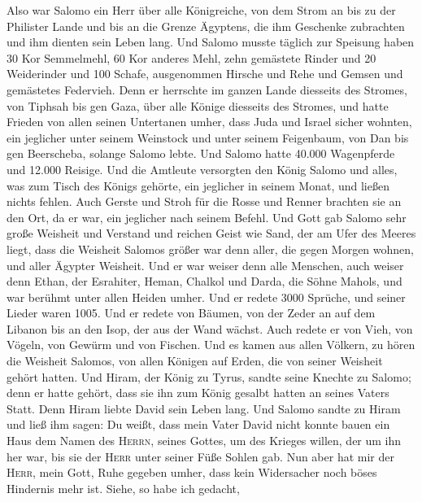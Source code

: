  Also war Salomo ein Herr über alle Königreiche, von dem
Strom an bis zu der Philister Lande und bis an die Grenze Ägyptens, die
ihm Geschenke zubrachten und ihm dienten sein Leben lang. 
Und Salomo musste täglich zur Speisung haben 30 Kor Semmelmehl, 60 Kor
anderes Mehl,  zehn gemästete Rinder und 20 Weiderinder
und 100 Schafe, ausgenommen Hirsche und Rehe und Gemsen und gemästetes
Federvieh.  Denn er herrschte im ganzen Lande diesseits
des Stromes, von Tiphsah bis gen Gaza, über alle Könige diesseits des
Stromes, und hatte Frieden von allen seinen Untertanen umher,
 dass Juda und Israel sicher wohnten, ein jeglicher unter
seinem Weinstock und unter seinem Feigenbaum, von Dan bis gen
Beerscheba, solange Salomo lebte.  Und Salomo hatte 40.000
Wagenpferde und 12.000 Reisige.  Und die Amtleute
versorgten den König Salomo und alles, was zum Tisch des Königs gehörte,
ein jeglicher in seinem Monat, und ließen nichts fehlen. 
Auch Gerste und Stroh für die Rosse und Renner brachten sie an den Ort,
da er war, ein jeglicher nach seinem Befehl.  Und Gott gab
Salomo sehr große Weisheit und Verstand und reichen Geist wie Sand, der
am Ufer des Meeres liegt,  dass die Weisheit Salomos
größer war denn aller, die gegen Morgen wohnen, und aller Ägypter
Weisheit.  Und er war weiser denn alle Menschen, auch
weiser denn Ethan, der Esrahiter, Heman, Chalkol und Darda, die Söhne
Mahols, und war berühmt unter allen Heiden umher.  Und er
redete 3000 Sprüche, und seiner Lieder waren 1005.  Und
er redete von Bäumen, von der Zeder an auf dem Libanon bis an den Isop,
der aus der Wand wächst. Auch redete er von Vieh, von Vögeln, von Gewürm
und von Fischen.  Und es kamen aus allen Völkern, zu
hören die Weisheit Salomos, von allen Königen auf Erden, die von seiner
Weisheit gehört hatten.  Und Hiram, der König zu Tyrus,
sandte seine Knechte zu Salomo; denn er hatte gehört, dass sie ihn zum
König gesalbt hatten an seines Vaters Statt. Denn Hiram liebte David
sein Leben lang.  Und Salomo sandte zu Hiram und ließ ihm
sagen:  Du weißt, dass mein Vater David nicht konnte
bauen ein Haus dem Namen des \textsc{Herrn}, seines Gottes, um des
Krieges willen, der um ihn her war, bis sie der \textsc{Herr} unter
seiner Füße Sohlen gab.  Nun aber hat mir der
\textsc{Herr}, mein Gott, Ruhe gegeben umher, dass kein Widersacher noch
böses Hindernis mehr ist.  Siehe, so habe ich gedacht,
